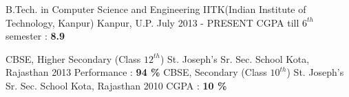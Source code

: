
\begin{cventries}

  \cventry
    {B.Tech. in Computer Science and Engineering} %
    {IITK(Indian Institute of Technology, Kanpur)} %
    {Kanpur, U.P.} %
    {July 2013 - PRESENT} %
    {
    	CGPA till $6^{th}$ semester : \textbf{8.9}
    }
    
   \cventry
       {CBSE, Higher Secondary (Class $12^{th}$)} %
       {St. Joseph's Sr. Sec. School} %
       {Kota, Rajasthan} %
       {2013} %
       {
       	 Performance : \textbf{94 \%}
       }
	\cventry
	{CBSE, Secondary (Class $10^{th}$)} %
	{St. Joseph's Sr. Sec. School} %
	{Kota, Rajasthan} %
	{2010} %
	{
		CGPA : \textbf{10 \%}
	}
\end{cventries}
